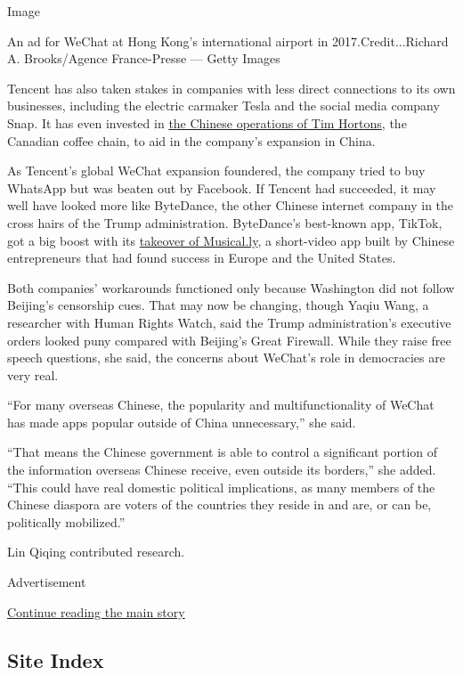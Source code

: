 Image

An ad for WeChat at Hong Kong's international airport in
2017.Credit...Richard A. Brooks/Agence France-Presse --- Getty Images

Tencent has also taken stakes in companies with less direct connections
to its own businesses, including the electric carmaker Tesla and the
social media company Snap. It has even invested in
\href{https://weibo.com/6969784101/J1y7JuKuM?from=page_1006066969784101_profile\&wvr=6\&mod=weibotime}{the
Chinese operations of Tim Hortons}, the Canadian coffee chain, to aid in
the company's expansion in China.

As Tencent's global WeChat expansion foundered, the company tried to buy
WhatsApp but was beaten out by Facebook. If Tencent had succeeded, it
may well have looked more like ByteDance, the other Chinese internet
company in the cross hairs of the Trump administration. ByteDance's
best-known app, TikTok, got a big boost with its
\href{https://www.nytimes3xbfgragh.onion/2017/11/10/business/dealbook/musically-sold-app-video.html}{takeover
of Musical.ly}, a short-video app built by Chinese entrepreneurs that
had found success in Europe and the United States.

Both companies' workarounds functioned only because Washington did not
follow Beijing's censorship cues. That may now be changing, though Yaqiu
Wang, a researcher with Human Rights Watch, said the Trump
administration's executive orders looked puny compared with Beijing's
Great Firewall. While they raise free speech questions, she said, the
concerns about WeChat's role in democracies are very real.

``For many overseas Chinese, the popularity and multifunctionality of
WeChat has made apps popular outside of China unnecessary,'' she said.

``That means the Chinese government is able to control a significant
portion of the information overseas Chinese receive, even outside its
borders,'' she added. ``This could have real domestic political
implications, as many members of the Chinese diaspora are voters of the
countries they reside in and are, or can be, politically mobilized.''

Lin Qiqing contributed research.

Advertisement

\protect\hyperlink{after-bottom}{Continue reading the main story}

\hypertarget{site-index}{%
\subsection{Site Index}\label{site-index}}

